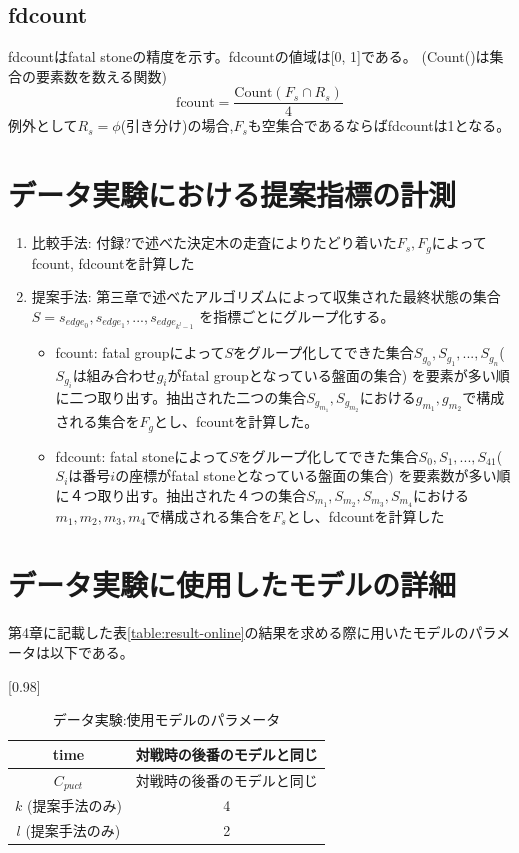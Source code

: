 \subsection{fdcount}
fdcountはfatal stoneの精度を示す。fdcountの値域は[0, 1]である。
(Count()は集合の要素数を数える関数)
\begin{equation}
	{\textrm{fcount} = \frac{\textrm{Count}(F_s \cap R_s)}{4}  }
\end{equation}
例外として$R_s=\phi$(引き分け)の場合,$F_s$も空集合であるならばfdcountは1となる。
\section{データ実験における提案指標の計測}

\begin{enumerate}
	\item 比較手法: 付録?で述べた決定木の走査によりたどり着いた$F_s, F_g$によってfcount, fdcountを計算した
	\item 提案手法: 第三章で述べたアルゴリズムによって収集された最終状態の集合$S={s_{edge_0}, s_{edge_1}, ..., s_{edge_{k^l-1}}}$
	    を指標ごとにグループ化する。
		\begin{itemize}
			\item fcount: fatal groupによって$S$をグループ化してできた集合${S_{g_0}, S_{g_1}, ..., S_{g_n}}$($S_{g_i}$は組み合わせ$g_i$がfatal groupとなっている盤面の集合)
			を要素が多い順に二つ取り出す。抽出された二つの集合${S_{g_{m_1}}, S_{g_{m_2}}}$における${g_{m_1}, g_{m_2}}$で構成される集合を$F_g$とし、fcountを計算した。
			\item fdcount: fatal stoneによって$S$をグループ化してできた集合${S_0, S_1, ..., S_41}$($S_i$は番号$i$の座標がfatal stoneとなっている盤面の集合)
			を要素数が多い順に４つ取り出す。抽出された４つの集合${S_{m_1}, S_{m_2}, S_{m_3}, S_{m_4}}$における${m_1, m_2, m_3, m_4}$で構成される集合を$F_s$とし、fdcountを計算した
		\end{itemize}
		
\end{enumerate}

\section{データ実験に使用したモデルの詳細}
第4章に記載した表\ref{table:result-online}の結果を求める際に用いたモデルのパラメータは以下である。
\begin{table}[H]
	\caption{データ実験:使用モデルのパラメータ}
	\centering
	\scalebox{0.98}[0.98]{
		\begin{tabular}{c|c}
			
			time    & 対戦時の後番のモデルと同じ \\ \hline
			$C_{puct}$    & 対戦時の後番のモデルと同じ \\
			$k$ (提案手法のみ)     & 4 \\
			$l$ (提案手法のみ)     & 2 \\
		\end{tabular}
	}
	\label{table:param-data}
\end{table}

